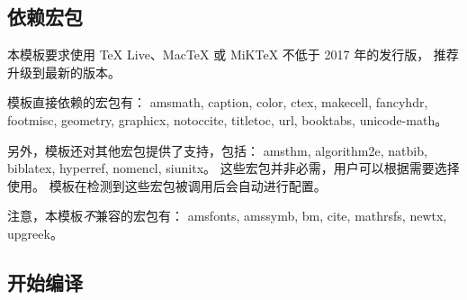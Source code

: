 \documentclass[a4paper]{ltxdoc}
\DeclareRobustCommand\pkg{\textsf}
\begin{document}
\subsection{依赖宏包}

本模板要求使用 TeX Live、MacTeX 或 MiKTeX 不低于 2017 年的发行版，
推荐升级到最新的版本。

模板直接依赖的宏包有：
\pkg{amsmath},
\pkg{caption},
\pkg{color},
\pkg{ctex},
\pkg{makecell},
\pkg{fancyhdr},
\pkg{footmisc},
\pkg{geometry},
\pkg{graphicx},
\pkg{notoccite},
\pkg{titletoc},
\pkg{url},
\pkg{booktabs},
\pkg{unicode-math}。

另外，模板还对其他宏包提供了支持，包括：
\pkg{amsthm},
\pkg{algorithm2e},
\pkg{natbib},
\pkg{biblatex},
\pkg{hyperref},
\pkg{nomencl},
\pkg{siunitx}。
这些宏包并非必需，用户可以根据需要选择使用。
模板在检测到这些宏包被调用后会自动进行配置。

注意，本模板\emph{不}兼容的宏包有：
\pkg{amsfonts},
\pkg{amssymb},
\pkg{bm},
\pkg{cite},
\pkg{mathrsfs},
\pkg{newtx},
\pkg{upgreek}。


\subsection{开始编译}
\end{document}
